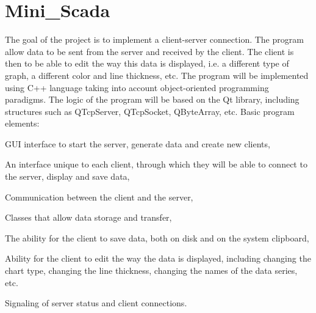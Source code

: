 \chapter{Mini\+\_\+\+Scada}
\hypertarget{md__c_1_2_git_hub_2mini__scada_2_r_e_a_d_m_e}{}\label{md__c_1_2_git_hub_2mini__scada_2_r_e_a_d_m_e}
\label{md__c_1_2_git_hub_2mini__scada_2_r_e_a_d_m_e_autotoc_md0}%
%
 The goal of the project is to implement a client-\/server connection. The program allow data to be sent from the server and received by the client. The client is then to be able to edit the way this data is displayed, i.\+e. a different type of graph, a different color and line thickness, etc. The program will be implemented using C++ language taking into account object-\/oriented programming paradigms. The logic of the program will be based on the Qt library, including structures such as QTcp\+Server, QTcp\+Socket, QByte\+Array, etc. Basic program elements\+:
\begin{DoxyItemize}
\item GUI interface to start the server, generate data and create new clients,
\item An interface unique to each client, through which they will be able to connect to the server, display and save data,
\item Communication between the client and the server,
\item Classes that allow data storage and transfer,
\item The ability for the client to save data, both on disk and on the system clipboard,
\item Ability for the client to edit the way the data is displayed, including changing the chart type, changing the line thickness, changing the names of the data series, etc.
\item Signaling of server status and client connections. 
\end{DoxyItemize}